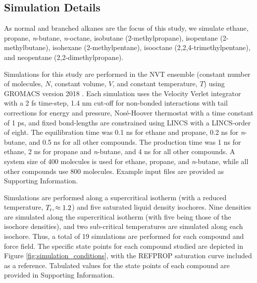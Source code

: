 \documentclass[journal=jctc,manuscript=article]{achemso}
\begin{document}
\subsection{Simulation Details}

As normal and branched alkanes are the focus of this study, we simulate ethane, propane, \textit{n}-butane, \textit{n}-octane, isobutane (2-methylpropane), isopentane (2-methylbutane), isohexane (2-methylpentane), isooctane (2,2,4-trimethylpentane), and neopentane (2,2-dimethylpropane).

Simulations for this study are performed in the NVT ensemble (constant number of molecules, $N$, constant volume, $V$, and constant temperature, $T$) using GROMACS version 2018 \cite{GROMACS_2018}. Each simulation uses the Velocity Verlet integrator with a 2 fs time-step, 1.4 nm cut-off for non-bonded interactions with tail corrections for energy and pressure, Nos{\'e}-Hoover thermostat with a time constant of 1 ps, and fixed bond-lengths are constrained using LINCS with a LINCS-order of eight. The equilibration time was 0.1 ns for ethane and propane, 0.2 ns for \textit{n}-butane, and 0.5 ns for all other compounds. The production time was 1 ns for ethane, 2 ns for propane and \textit{n}-butane, and 4 ns for all other compounds. A system size of 400 molecules is used for ethane, propane, and \textit{n}-butane, while all other compounds use 800 molecules. Example input files are provided as Supporting Information.

Simulations are performed along a supercritical isotherm (with a reduced temperature, $T_{\rm r}, \approx 1.2$) and five saturated liquid density isochores. Nine densities are simulated along the supercritical isotherm (with five being those of the isochore densities), and two sub-critical temperatures are simulated along each isochore. Thus, a total of 19 simulations are performed for each compound and force field. The specific state points for each compound studied are depicted in Figure \ref{fig:simulation_conditions}, with the REFPROP saturation curve included as a reference. Tabulated values for the state points of each compound are provided in Supporting Information.
\end{document}
